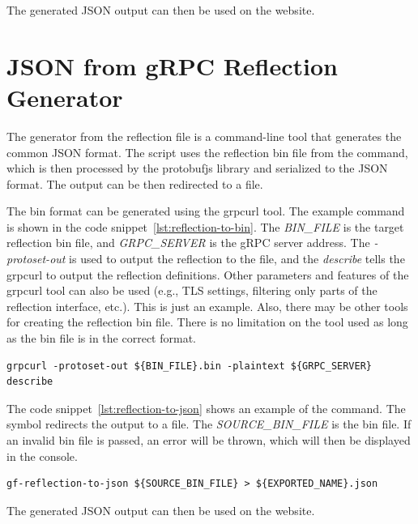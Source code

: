 The generated JSON output can then be used on the website.


\section{JSON from gRPC Reflection Generator}
The generator from the reflection file is a command-line tool that generates the common JSON format.
The script uses the reflection bin file from the command, which is then processed by the protobufjs library and serialized to the JSON format.
The output can be then redirected to a file.

The bin format can be generated using the grpcurl tool.
The example command is shown in the code snippet~\ref{lst:reflection-to-bin}.
The \textit{BIN\_FILE} is the target reflection bin file, and \textit{GRPC\_SERVER} is the gRPC server address.
The \textit{-protoset-out} is used to output the reflection to the file, and the \textit{describe} tells the grpcurl to output the reflection definitions.
Other parameters and features of the grpcurl tool can also be used (e.g., TLS settings, filtering only parts of the reflection interface, etc.).
This is just an example.
Also, there may be other tools for creating the reflection bin file.
There is no limitation on the tool used as long as the bin file is in the correct format.

\begin{lstlisting}[caption={proto-to-json command example}, label={lst:reflection-to-bin}]
grpcurl -protoset-out ${BIN_FILE}.bin -plaintext ${GRPC_SERVER} describe
\end{lstlisting}

The code snippet~\ref{lst:reflection-to-json} shows an example of the command.
The symbol \textit{\>} redirects the output to a file.
The \textit{SOURCE\_BIN\_FILE} is the bin file.
If an invalid bin file is passed, an error will be thrown, which will then be displayed in the console.

\begin{lstlisting}[caption={proto-to-json command example}, label={lst:reflection-to-json}]
gf-reflection-to-json ${SOURCE_BIN_FILE} > ${EXPORTED_NAME}.json
\end{lstlisting}

The generated JSON output can then be used on the website.


